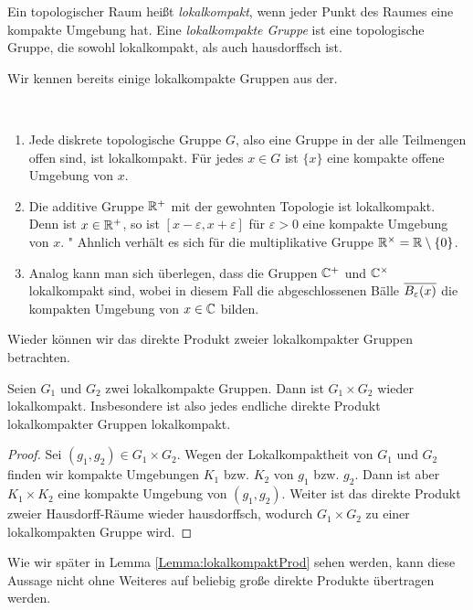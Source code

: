 	\begin{defi}
		Ein topologischer Raum heißt \emph{lokalkompakt}, wenn jeder Punkt des Raumes eine kompakte Umgebung hat. 
		Eine \emph{lokalkompakte Gruppe} ist eine topologische Gruppe, die sowohl lokalkompakt, als auch hausdorffsch ist. 
	\end{defi}
	Wir kennen bereits einige lokalkompakte Gruppen aus der.
	\begin{bsp}~ 
		\begin{enumerate}[label=(\alph*)]
			\item Jede diskrete topologische Gruppe $G$, also eine Gruppe in der alle Teilmengen offen sind, ist lokalkompakt. 
				Für jedes $x \in G$ ist $\{x\}$ eine kompakte offene Umgebung von $x$.
			\item Die additive Gruppe $\mathbb{R}^+$ mit der gewohnten Topologie ist lokalkompakt. 
				Denn ist $x\in\mathbb{R}^+$, so ist $[x-\varepsilon, x+\varepsilon]$ für $\varepsilon>0$ eine kompakte Umgebung von $x$. "
				Ahnlich verhält es sich für die multiplikative Gruppe $\mathbb{R}^\times = \mathbb{R} \setminus\{0\}$.
			\item Analog kann man sich überlegen, dass die Gruppen $\mathbb{C}^+$ und $\mathbb{C}^\times$ lokalkompakt sind, wobei in diesem Fall die abgeschlossenen Bälle $\overline{B_\varepsilon(x)}$ die kompakten Umgebung von $x\in\mathbb{C}$ bilden.
		\end{enumerate}
	\end{bsp}
	Wieder können wir das direkte Produkt zweier lokalkompakter Gruppen betrachten. 
	\begin{lemma}\label{satz:topo:lcaproduct}
		Seien $G_1$ und $G_2$ zwei lokalkompakte Gruppen. 
		Dann ist $G_1\times G_2$ wieder lokalkompakt. 
		Insbesondere ist also jedes endliche direkte Produkt lokalkompakter Gruppen lokalkompakt.
	\end{lemma}
	\begin{proof}
		Sei $(g_1,g_2) \in G_1\times G_2$. Wegen der Lokalkompaktheit von $G_1$ und $G_2$ finden wir kompakte Umgebungen $K_1$ bzw. $K_2$ von $g_1$ bzw. $g_2$.
		Dann ist aber $K_1 \times K_2$ eine kompakte Umgebung von $(g_1,g_2)$. 
		Weiter ist das direkte Produkt zweier Hausdorff-Räume wieder hausdorffsch, wodurch $G_1\times G_2$ zu einer lokalkompakten Gruppe wird.
	\end{proof}
	Wie wir später in Lemma \ref{Lemma:lokalkompaktProd} sehen werden, kann diese Aussage nicht ohne Weiteres auf beliebig große direkte Produkte übertragen werden.


